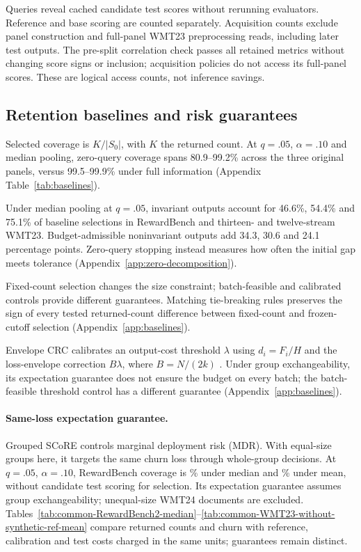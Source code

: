 \documentclass[11pt]{article}
\begin{document}
Queries reveal cached candidate test scores without rerunning evaluators. Reference and base scoring are counted separately. Acquisition counts exclude panel construction and full-panel WMT23 preprocessing reads, including later test outputs. The pre-split correlation check passes all retained metrics without changing score signs or inclusion; acquisition policies do not access its full-panel scores. These are logical access counts, not inference savings. 



\subsection{Retention baselines and risk guarantees}
Selected coverage is $K/|S_0|$, with $K$ the returned count. At $q=.05$, $\alpha=.10$ and median pooling, zero-query coverage spans 80.9--99.2\% across the three original panels, versus 99.5--99.9\% under full information (Appendix Table~\ref{tab:baselines}).

Under median pooling at $q=.05$, invariant outputs account for 46.6\%, 54.4\% and 75.1\% of baseline selections in RewardBench and thirteen- and twelve-stream WMT23. Budget-admissible noninvariant outputs add 34.3, 30.6 and 24.1 percentage points. Zero-query stopping instead measures how often the initial gap meets tolerance (Appendix~\ref{app:zero-decomposition}).

Fixed-count selection changes the size constraint; batch-feasible and calibrated controls provide different guarantees. Matching tie-breaking rules preserves the sign of every tested returned-count difference between fixed-count and frozen-cutoff selection (Appendix~\ref{app:baselines}).

Envelope CRC calibrates an output-cost threshold $\lambda$ using $d_i=F_i/H$ and the loss-envelope correction $B\lambda$, where $B=N/(2k)$ \citep{yeh2025conformal}. Under group exchangeability, its expectation guarantee does not ensure the budget on every batch; the batch-feasible threshold control has a different guarantee (Appendix~\ref{app:baselines}).

\paragraph{Same-loss expectation guarantee.}
Grouped SCoRE controls marginal deployment risk (MDR). With equal-size groups here, it targets the same churn loss through whole-group decisions. At $q=.05$, $\alpha=.10$, RewardBench coverage is \scoreRbMedianCov\% under median and \scoreRbMeanCov\% under mean, without candidate test scoring for selection. Its expectation guarantee assumes group exchangeability; unequal-size WMT24 documents are excluded. Tables~\ref{tab:common-RewardBench2-median}--\ref{tab:common-WMT23-without-synthetic-ref-mean} compare returned counts and churn with reference, calibration and test costs charged in the same units; guarantees remain distinct.
\end{document}
